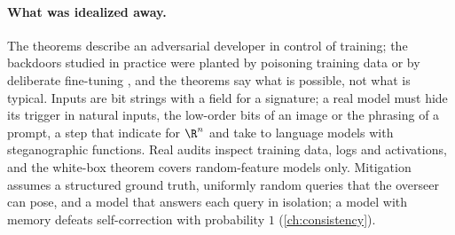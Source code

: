 \begin{refsection}
\paragraph{What was idealized away.} The theorems describe an adversarial developer in control of training; the backdoors studied in practice were planted by poisoning training data \parencite{GuEtAl2019} or by deliberate fine-tuning \parencite{HubingerEtAl2024}, and the theorems say what is possible, not what is typical. Inputs are bit strings with a field for a signature; a real model must hide its trigger in natural inputs, the low-order bits of an image or the phrasing of a prompt, a step that \textcite{GoldwasserEtAl2022} indicate for $\R^n$ and \textcite{KalavasisEtAl2024} take to language models with steganographic functions. Real audits inspect training data, logs and activations, and the white-box theorem covers random-feature models only. Mitigation assumes a structured ground truth, uniformly random queries that the overseer can pose, and a model that answers each query in isolation; a model with memory defeats self-correction with probability $1$ (\cref{ch:consistency}).


\end{refsection}
